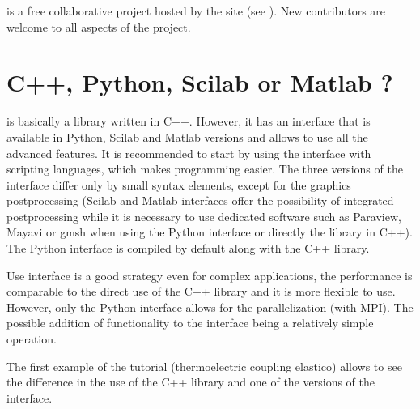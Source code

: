 \documentclass[a4paper,11pt,english]{sphinxmanual}
\begin{document}
\sphinxAtStartPar
{} is a free collaborative project hosted by the  site (see ). New contributors are welcome to all aspects of the project.


\section{C++, Python, Scilab or Matlab ?}
\label{\detokenize{tutorial/intro:c-python-scilab-or-matlab}}
\sphinxAtStartPar
{} is basically a library written in C++. However, it has an interface that is available in Python, Scilab and Matlab  versions and allows to use all the advanced features. It is recommended to start by using the interface with scripting languages, which makes programming easier. The three versions of the interface differ only by small syntax elements, except for the graphics post\sphinxhyphen{}processing (Scilab and Matlab interfaces offer the possibility of integrated post\sphinxhyphen{}processing while it is necessary to use dedicated software such as Paraview, Mayavi or gmsh when using the Python interface or directly the library in C++). The Python interface is compiled by default along with the C++ library.

\sphinxAtStartPar
Use  interface is a good strategy even for complex applications, the performance is comparable to the direct use of the C++ library and it is more flexible to use. However, only the Python interface allows for the parallelization (with MPI). The possible addition of functionality to the interface being a relatively simple operation.

\sphinxAtStartPar
The first example of the tutorial (thermo\sphinxhyphen{}electric coupling elastico) allows to see the difference in the use of the C++ library and one of the versions of the interface.
\end{document}
